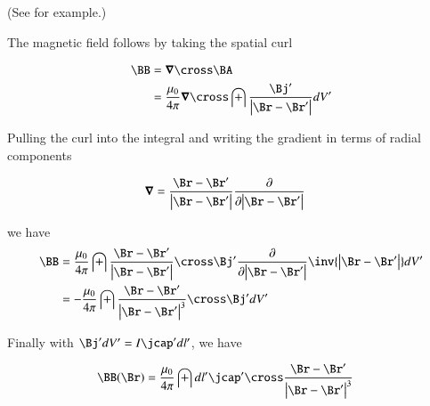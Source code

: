 \documentclass{article}
\begin{document}
(See \cite{schwartz1987pe} for example.)

The magnetic field follows by taking the spatial curl

\begin{align*}
\BB
&= \spacegrad \cross \BA \\
&= \frac{\mu_0}{4 \pi} \spacegrad \cross \int \frac{\Bj'}{\Abs{\Br-\Br'}} dV'
\end{align*}

Pulling the curl into the integral and writing the gradient in terms of radial components

\begin{align*}
\spacegrad &= \frac{\Br - \Br'}{\Abs{\Br - \Br'}} \PD{\Abs{\Br - \Br'}}{}
\end{align*}

we have
\begin{align*}
\BB
&= \frac{\mu_0}{4 \pi} \int
\frac{\Br - \Br'}{\Abs{\Br - \Br'}} \cross \Bj' \PD{\Abs{\Br - \Br'}}{}{\inv{ \Abs{\Br-\Br'} }} dV' \\
&= -\frac{\mu_0}{4 \pi} \int
\frac{\Br - \Br'}{\Abs{\Br - \Br'}^3} \cross \Bj' dV' \\
\end{align*}

Finally with $\Bj' dV' = I \jcap' dl'$, we have

\begin{align}
\BB(\Br) &= \frac{\mu_0}{4 \pi} \int dl' \jcap' \cross \frac{\Br - \Br'}{\Abs{\Br - \Br'}^3}
\end{align}



\end{document}
